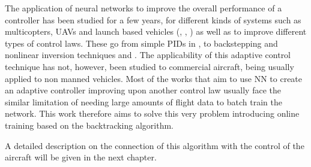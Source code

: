 The application of neural networks to improve the overall performance of a controller has been studied for a few years, for different kinds of systems such as multicopters, UAVs and launch based vehicles (\cite{NLI+NN}, \cite{YANG+LIN_Adaptive_Flight_Control}, \cite{NN_PID2}) as well as to improve different types of control laws. These go from simple PIDs in \cite{NN_PID}, \cite{NN_PID2} to  backstepping and nonlinear inversion techniques \cite{NN_backlash} and \citep{NN_NLI}. The applicability of this adaptive control technique has not, however, been studied to commercial aircraft, being usually applied to non manned vehicles. Most of the works that aim to use NN to create an adaptive controller improving upon another control law usually face the similar limitation of needing large amounts of flight data to batch train the network. This work therefore aims to solve this very problem introducing online training based on the backtracking algorithm. 
 
A detailed description on the connection of this algorithm with the control of the aircraft will be given in the next chapter.


